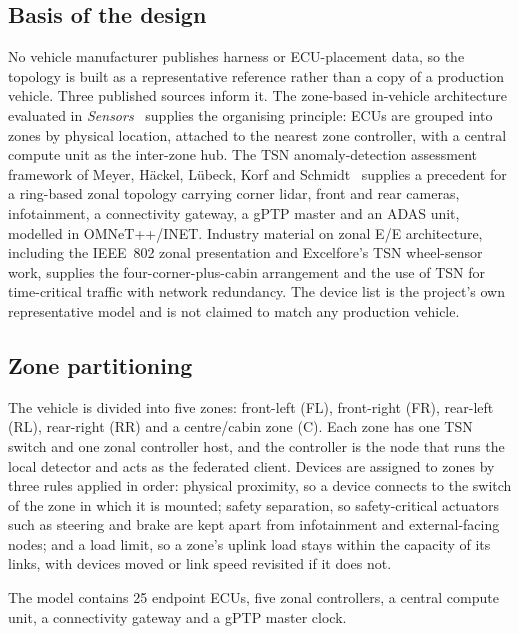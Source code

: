 \subsection{Basis of the design}
No vehicle manufacturer publishes harness or ECU-placement data, so the topology is
built as a representative reference rather than a copy of a production vehicle. Three
published sources inform it. The zone-based in-vehicle architecture evaluated in
\emph{Sensors}~\cite{park2023zonal} supplies the organising principle: ECUs are grouped into zones
by physical location, attached to the nearest zone controller, with a central compute
unit as the inter-zone hub. The TSN anomaly-detection assessment framework of
Meyer, H\"ackel, L\"ubeck, Korf and Schmidt~\cite{meyer2024framework} supplies a precedent for a
ring-based zonal topology carrying
corner lidar, front and rear cameras, infotainment, a connectivity gateway, a gPTP
master and an ADAS unit, modelled in OMNeT++/INET. Industry material on zonal E/E
architecture, including the IEEE~802 zonal presentation and Excelfore's TSN wheel-sensor
work, supplies the four-corner-plus-cabin arrangement and the use of TSN for
time-critical traffic with network redundancy. The device list is the project's own
representative model and is not claimed to match any production vehicle.

\subsection{Zone partitioning}
The vehicle is divided into five zones: front-left (FL), front-right (FR), rear-left
(RL), rear-right (RR) and a centre/cabin zone (C). Each zone has one TSN switch and
one zonal controller host, and the controller is the node that runs the local detector
and acts as the federated client. Devices are assigned to zones by three rules applied
in order: physical proximity, so a device connects to the switch of the zone in which
it is mounted; safety separation, so safety-critical actuators such as steering and
brake are kept apart from infotainment and external-facing nodes; and a load limit, so
a zone's uplink load stays within the capacity of its links, with devices moved or link
speed revisited if it does not.

The model contains 25 endpoint ECUs, five zonal controllers, a central compute unit, a
connectivity gateway and a gPTP master clock.

